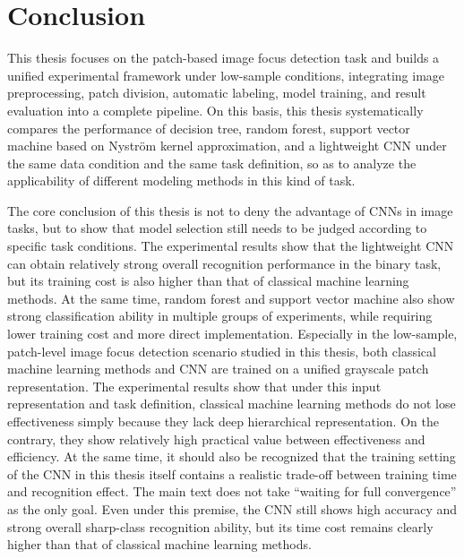 \chapter{Conclusion}
\par This thesis focuses on the patch-based image focus detection task
\cite{Hou_2016_CVPR} and builds a unified experimental framework under
low-sample conditions, integrating image preprocessing, patch division,
automatic labeling, model training, and result evaluation into a complete
pipeline. On this basis, this thesis systematically compares the performance
of decision tree, random forest, support vector machine based on
Nystr\"{o}m kernel approximation, and a lightweight CNN
\cite{lecun2002gradient,krizhevsky2012imagenet} under the same data condition
and the same task definition, so as to analyze the applicability of different
modeling methods in this kind of task.

\par The core conclusion of this thesis is not to deny the advantage of CNNs in
image tasks, but to show that model selection still needs to be judged
according to specific task conditions. The experimental results show that the
lightweight CNN can obtain relatively strong overall recognition performance in
the binary task, but its training cost is also higher than that of classical
machine learning methods. At the same time, random forest and support vector
machine also show strong classification ability in multiple groups of
experiments, while requiring lower training cost and more direct
implementation. Especially in the low-sample, patch-level image focus
detection scenario studied in this thesis, both classical machine learning
methods and CNN are trained on a unified grayscale patch representation. The
experimental results show that under this input representation and task
definition, classical machine learning methods do not lose effectiveness simply
because they lack deep hierarchical representation. On the contrary, they show
relatively high practical value between effectiveness and efficiency. At the
same time, it should also be recognized that the training setting of the CNN
in this thesis itself contains a realistic trade-off between training time and
recognition effect. The main text does not take ``waiting for full
convergence'' as the only goal. Even under this premise, the CNN still shows
high accuracy and strong overall sharp-class recognition ability, but its time
cost remains clearly higher than that of classical machine learning methods.

